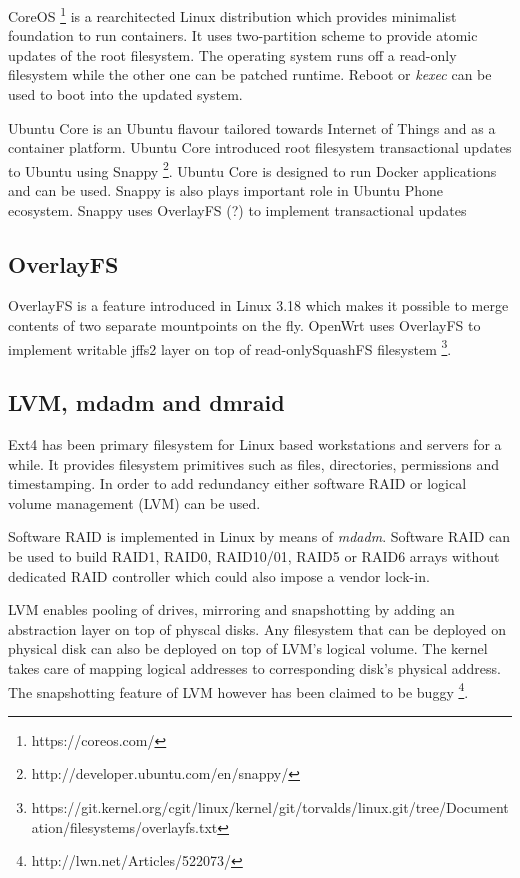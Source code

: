 \documentclass{article}
\begin{document}
CoreOS \footnote{https://coreos.com/} is a rearchitected Linux distribution
which provides minimalist foundation to run containers.
It uses two-partition scheme to provide atomic updates of the root filesystem.
The operating system runs off a read-only filesystem while the other one
can be patched runtime. Reboot or \emph{kexec} can be used to boot into
the updated system.

Ubuntu Core is an Ubuntu flavour tailored towards Internet of Things and as a
container platform. Ubuntu Core introduced root filesystem transactional
updates to Ubuntu using Snappy
\footnote{http://developer.ubuntu.com/en/snappy/}.
Ubuntu Core is designed to run Docker applications and can be used.
Snappy is also plays important role in Ubuntu Phone ecosystem.
Snappy uses OverlayFS (?) to implement transactional updates 


\subsection{OverlayFS}

OverlayFS is a feature introduced in Linux 3.18 which makes it possible to merge contents of two separate mountpoints on the fly.
OpenWrt uses OverlayFS to implement writable jffs2 layer on top of read-onlySquashFS filesystem \footnote{https://git.kernel.org/cgit/linux/kernel/git/torvalds/linux.git/tree/Documentation/filesystems/overlayfs.txt}.

\subsection{LVM, mdadm and dmraid}

Ext4 has been primary filesystem for Linux based workstations and servers for
a while. It provides filesystem primitives such as files, directories,
permissions and timestamping. In order to add redundancy either software RAID
or logical volume management (LVM) can be used.

Software RAID is implemented in Linux by means of \emph{mdadm}. Software RAID
can be used to build RAID1, RAID0, RAID10/01, RAID5 or RAID6 arrays without
dedicated RAID controller which could also impose a vendor lock-in.

LVM enables pooling of drives, mirroring and snapshotting by adding an
abstraction layer on top of physcal disks. Any filesystem that can be deployed
on physical disk can also be deployed on top of LVM's logical volume. The
kernel takes care of mapping logical addresses to corresponding disk's physical
address. The snapshotting feature of LVM however has been claimed to be buggy
\footnote{http://lwn.net/Articles/522073/}.
\end{document}
